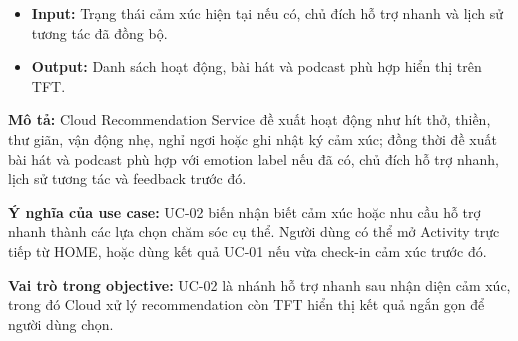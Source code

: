 \documentclass[12pt,a4paper]{article}
\begin{document}
\begin{itemize}
\item \textbf{Input:} Trạng thái cảm xúc hiện tại nếu có, chủ đích hỗ trợ nhanh và lịch sử tương tác đã đồng bộ.
\item \textbf{Output:} Danh sách hoạt động, bài hát và podcast phù hợp hiển thị trên TFT.
\end{itemize}

\textbf{Mô tả:} Cloud Recommendation Service đề xuất hoạt động như hít thở, thiền, thư giãn, vận động nhẹ, nghỉ ngơi hoặc ghi nhật ký cảm xúc; đồng thời đề xuất bài hát và podcast phù hợp với emotion label nếu đã có, chủ đích hỗ trợ nhanh, lịch sử tương tác và feedback trước đó.


\textbf{Ý nghĩa của use case:} UC-02 biến nhận biết cảm xúc hoặc nhu cầu hỗ trợ nhanh thành các lựa chọn chăm sóc cụ thể. Người dùng có thể mở Activity trực tiếp từ HOME, hoặc dùng kết quả UC-01 nếu vừa check-in cảm xúc trước đó.


\textbf{Vai trò trong objective:} UC-02 là nhánh hỗ trợ nhanh sau nhận diện cảm xúc, trong đó Cloud xử lý recommendation còn TFT hiển thị kết quả ngắn gọn để người dùng chọn.
\end{document}
